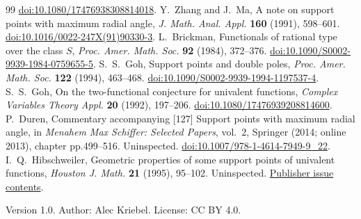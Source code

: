 \documentclass[10pt]{article}
\begin{document}
\begin{thebibliography}{99}
\href{https://doi.org/10.1080/17476938308814018}{doi:10.1080/17476938308814018}.
Y.~Zhang and J.~Ma, A note on support points with maximum radial angle,
\emph{J. Math. Anal. Appl.} \textbf{160} (1991), 598--601.
\href{https://doi.org/10.1016/0022-247X(91)90330-3}{doi:10.1016/0022-247X(91)90330-3}.
L.~Brickman, Functionals of rational type over the class \(S\),
\emph{Proc. Amer. Math. Soc.} \textbf{92} (1984), 372--376.
\href{https://doi.org/10.1090/S0002-9939-1984-0759655-5}{doi:10.1090/S0002-9939-1984-0759655-5}.
S.~S.~Goh, Support points and double poles,
\emph{Proc. Amer. Math. Soc.} \textbf{122} (1994), 463--468.
\href{https://doi.org/10.1090/S0002-9939-1994-1197537-4}{doi:10.1090/S0002-9939-1994-1197537-4}.
S.~S.~Goh, On the two-functional conjecture for univalent functions,
\emph{Complex Variables Theory Appl.} \textbf{20} (1992), 197--206.
\href{https://doi.org/10.1080/17476939208814600}{doi:10.1080/17476939208814600}.
P.~Duren, Commentary accompanying [127] Support points with maximum
radial angle, in \emph{Menahem Max Schiffer: Selected Papers}, vol.~2,
Springer (2014; online 2013), chapter pp.499--516. Uninspected.
\href{https://doi.org/10.1007/978-1-4614-7949-9_22}{doi:10.1007/978-1-4614-7949-9\_22}.
I.~Q.~Hibschweiler, Geometric properties of some support points of
univalent functions, \emph{Houston J. Math.} \textbf{21} (1995),
95--102. Uninspected.
\href{https://www.math.uh.edu/~hjm/vol21-1.html}{Publisher issue contents}.
\end{thebibliography}
\smallskip\noindent\small
Version 1.0. Author: Alec Kriebel. License: CC BY 4.0.
\end{document}
